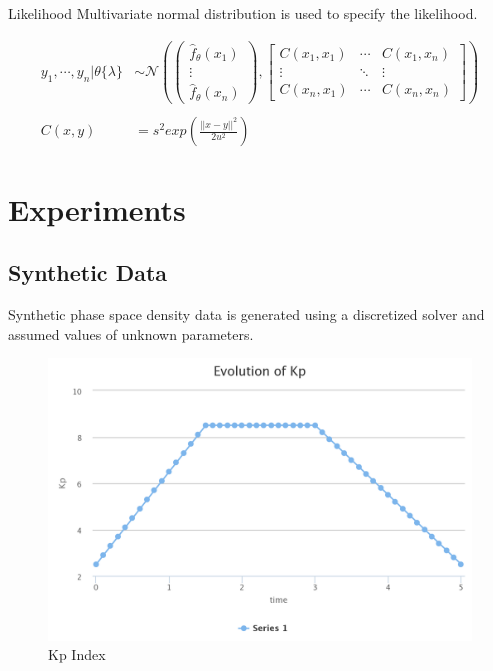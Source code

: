 \documentclass{beamer}
\begin{document}
\begin{frame}{Likelihood}
  Multivariate normal distribution is used to specify the likelihood.

  \begin{align*}
    y_{1}, \cdots, y_{n} | \theta\{\lambda\}  &\sim \mathcal{N} \left( \begin{pmatrix}
        \hat{f}_{\theta}(x_{1})\\ 
        \vdots\\ 
        \hat{f}_{\theta}(x_{n})
      \end{pmatrix},  \begin{bmatrix}
        C(x_{1}, x_{1}) & \cdots & C(x_{1}, x_{n})\\ 
        \vdots & \ddots  & \vdots \\ 
        C(x_{n}, x_{1}) & \cdots & C(x_{n}, x_{n}) 
      \end{bmatrix}\right) \\\\
    C(x, y) &= s^{2} exp(\frac{||x-y||^2}{2u^2})
  \end{align*}
  
\end{frame}

\section{Experiments}
\subsection{Synthetic Data}

\begin{frame}
  Synthetic phase space density data is generated using a discretized
  solver and assumed values of unknown parameters.
\end{frame}

\begin{frame}
  \begin{figure}[h]
  \includegraphics[width=\textwidth]{kp_profile.png}
   \caption{Kp Index}
  \label{fig:Kp}
\end{figure}
\end{frame}
\end{document}
